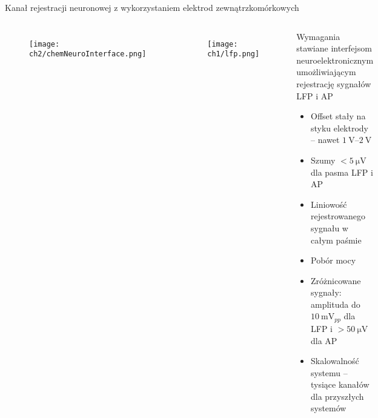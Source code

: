 \begin{frame}{Kanał rejestracji neuronowej z wykorzystaniem elektrod zewnątrzkomórkowych}

    \begin{columns}
        \begin{figure}[H]
            \centering
            \texttt{[image: ch2/chemNeuroInterface.png]} 

        \end{figure}
        \begin{figure}[H]
            \centering
            \texttt{[image: ch1/lfp.png]} 

          \end{figure}

        \begin{block}{Wymagania stawiane interfejsom neuroelektronicznym umożliwiającym rejestrację sygnałów LFP i AP}
            \begin{itemize}
                \item Offset stały na styku elektrody -- nawet $\SIrange{1}{2}{\volt}$ 
                \item Szumy $<\SI{5}{\micro\volt}$ dla pasma LFP i AP
                \item Liniowość rejestrowanego sygnału w całym paśmie
                \item Pobór mocy 
                \item Zróżnicowane sygnały: amplituda do $\SI{10}{\milli\volt_{pp}}$ dla LFP i $>\SI{50}{\micro\volt}$ dla AP
                \item Skalowalność systemu -- tysiące kanałów dla przyszłych systemów
            \end{itemize}
        \end{block}
 
    \end{columns}
\end{frame}


